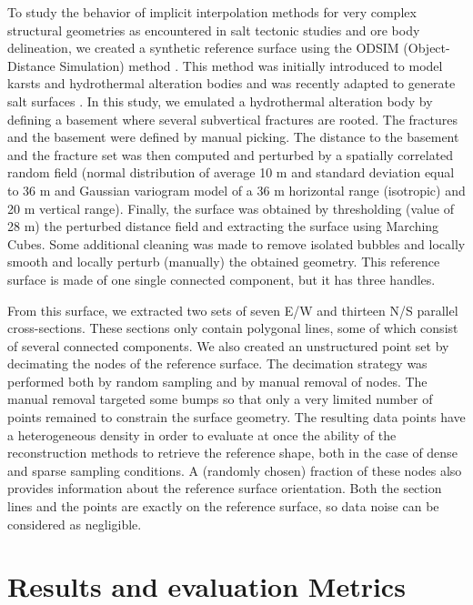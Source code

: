 \documentclass[preprint]{ring20}
\begin{document}
To study the behavior of implicit interpolation methods for very complex structural geometries as encountered in salt tectonic studies and ore body delineation, we created a synthetic reference surface using the ODSIM (Object-Distance Simulation) method \citep{Henrion2010MG}. This method was initially introduced to model karsts and hydrothermal alteration bodies \citep{Henrion2008PEIGC,Rongier2014G} and was recently adapted to generate salt surfaces \citep{Clausolles20188ECE2}. In this study, we emulated a hydrothermal alteration body by defining a basement where several subvertical fractures are rooted. The fractures and the basement were defined by manual picking. The distance to the basement and the fracture set was then computed and perturbed by a spatially correlated random field (normal distribution of average 10 m and standard deviation equal to 36 m and Gaussian variogram model of a 36 m horizontal range (isotropic) and 20 m vertical range). Finally, the surface was obtained 
by thresholding (value of 28 m) the perturbed distance field and extracting the surface using Marching Cubes. Some additional cleaning was made to remove isolated bubbles and locally smooth and locally perturb (manually) the obtained geometry. This reference surface is made of one single connected component, but it has three handles. 

From this surface, we extracted two sets of seven E/W and thirteen N/S parallel cross-sections. These sections only contain polygonal lines, some of which consist of several connected components. We also created an unstructured point set by decimating the nodes of the reference surface. The decimation strategy was performed both by random sampling and by manual removal of nodes. The manual removal targeted some bumps so that only a very limited number of points remained to constrain the surface geometry. The resulting data points have a heterogeneous density in order to evaluate at once the ability of the reconstruction methods to retrieve the reference shape, both in the case of dense and sparse sampling conditions. A (randomly chosen) fraction of these nodes also provides information about the reference surface orientation. Both the section lines and the points are exactly on the reference surface, so data noise can be considered as negligible. 


\section{Results and evaluation Metrics}
\label{sec:results}
\end{document}
